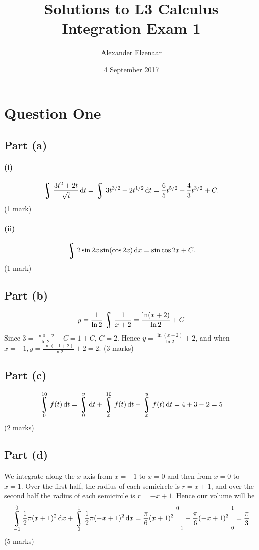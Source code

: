 \documentclass[a4paper]{report}
\title{Solutions to L3 Calculus Integration Exam 1}
\author{Alexander Elzenaar}
\date{4 September 2017}
\DeclareMathOperator*{\rint}{\scalerel*{\rotatebox{17}{$\!\int\!$}}{\int}}
\begin{document}
\maketitle

\section*{Question One}
\subsection*{Part (a)}
\paragraph{(i)}
\begin{displaymath}
  \rint \frac{3t^2 + 2t}{\sqrt{t}} \dif{t} = \rint 3t^{3/2} + 2t^{1/2} \dif{t} = \frac{6}{5} t^{5/2} + \frac{4}{3} t^{3/2} + C.
\end{displaymath}
(1 mark)

\paragraph{(ii)}
\begin{displaymath}
  \rint 2 \sin 2x \sin (\cos 2x) \dif{x} = \sin \cos 2x + C.
\end{displaymath}
(1 mark)

\subsection*{Part (b)}
\begin{displaymath}
  y = \frac{1}{\ln 2} \rint \frac{1}{x + 2} = \frac{\ln(x + 2)}{\ln 2} + C
\end{displaymath}
Since $ 3 = \frac{\ln{0 + 2}}{\ln 2} + C = 1 + C $, $ C = 2 $. Hence $ y = \frac{\ln(x + 2)}{\ln 2} + 2 $,
and when $ x = -1, y = \frac{\ln(-1 + 2)}{\ln 2} + 2 = 2 $.
(3 marks)

\subsection*{Part (c)}
\begin{displaymath}
  \rint^{10}_0 f(t) \dif{t} = \rint^y_0 \dif{t} + \rint^{10}_x f(t) \dif{t} - \rint^y_x f(t) \dif{t} = 4 + 3 - 2 = 5
\end{displaymath}
(2 marks)

\subsection*{Part (d)}
We integrate along the $ x$-axis from $ x = -1 $ to $ x = 0 $ and then from $ x = 0 $ to $ x = 1 $. Over the first half,
the radius of each semicircle is $ r = x + 1 $, and over the second half the radius of each semicircle is $ r = -x + 1 $.
Hence our volume will be
\begin{displaymath}
  \rint^0_{-1} \frac{1}{2} \pi (x + 1)^2 \dif{x} + \rint^1_0 \frac{1}{2} \pi (-x + 1)^2 \dif{x}
    = \eval{\frac{\pi}{6} (x + 1)^3}^0_{-1} - \eval{\frac{\pi}{6} (-x + 1)^3}^1_{0} = \frac{\pi}{3}
\end{displaymath}
(5 marks)
\end{document}
